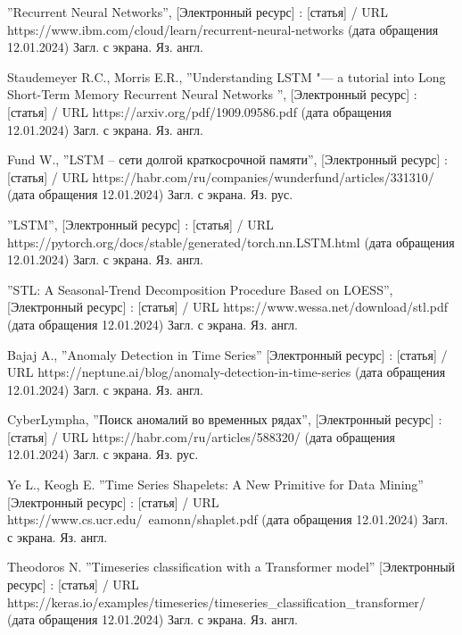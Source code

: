 \documentclass[bachelor, och, referat]{../shiza}
\begin{document}
\begin{thebibliography}{99}

     ''Recurrent Neural Networks'', [Электронный ресурс] :
    [статья] / URL https://www.ibm.com/cloud/learn/recurrent-neural-networks
    (дата обращения 12.01.2024) Загл. с экрана. Яз. англ.

     Staudemeyer R.C., Morris E.R., ''Understanding LSTM "--- a
    tutorial into Long Short-Term Memory Recurrent Neural Networks '',
    [Электронный ресурс] : [статья] / URL https://arxiv.org/pdf/1909.09586.pdf
    (дата обращения 12.01.2024) Загл. с экрана. Яз. англ.

     Fund W., ''LSTM – сети долгой краткосрочной памяти'',
    [Электронный ресурс] : [статья] / URL
    https://habr.com/ru/companies/wunderfund/articles/331310/ (дата обращения
    12.01.2024) Загл. с экрана. Яз. рус.

     ''LSTM'', [Электронный ресурс] : [статья] / URL
    https://pytorch.org/docs/stable/generated/torch.nn.LSTM.html
    (дата обращения 12.01.2024) Загл. с экрана. Яз. англ.

     ''STL: A Seasonal-Trend Decomposition Procedure Based on
    LOESS'', [Электронный ресурс] : [статья] / URL
    https://www.wessa.net/download/stl.pdf (дата обращения 12.01.2024) Загл. с
    экрана. Яз. англ.

     Bajaj A., ''Anomaly Detection in Time Series''
    [Электронный ресурс] : [статья] / URL
    https://neptune.ai/blog/anomaly-detection-in-time-series (дата обращения
    12.01.2024) Загл. с экрана. Яз. англ.

     CyberLympha, ''Поиск аномалий во временных рядах'',
    [Электронный ресурс] : [статья] / URL https://habr.com/ru/articles/588320/
    (дата обращения 12.01.2024) Загл. с экрана. Яз. рус.

     Ye L., Keogh E. ''Time Series Shapelets: A New Primitive
    for Data Mining'' [Электронный ресурс] : [статья] / URL
    https://www.cs.ucr.edu/~eamonn/shaplet.pdf (дата обращения 12.01.2024) Загл.
    с экрана. Яз. англ.

     Theodoros N. ''Timeseries classification with a Transformer
    model'' [Электронный ресурс] : [статья] / URL
    https://keras.io/examples/timeseries/timeseries_classification_transformer/
    (дата обращения 12.01.2024) Загл. с экрана. Яз. англ.

\end{thebibliography}
\end{document}
